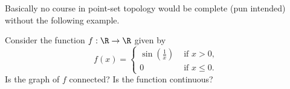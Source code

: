 \documentclass[12pt]{pset}
\begin{document}
\begin{problem}

  Basically no course in point-set topology would be complete (pun
  intended) without the following example.

  Consider the function $f : \R \to \R$ given by
  \[
  f(x) = \begin{cases}
    \sin \left( \frac{1}{x} \right) & \mbox{ if $x > 0$, } \\
    0 & \mbox{ if $x \leq 0$.}
  \end{cases}
  \]
  Is the graph of $f$ connected?  Is the function continuous?

\end{problem}
\end{document}
